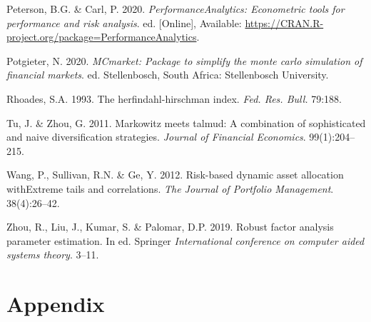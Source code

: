 \documentclass[11pt,preprint, authoryear]{elsarticle}
\numberwithin{equation}{section}
\numberwithin{figure}{section}
\numberwithin{table}{section}
\begin{document}
\leavevmode\hypertarget{ref-PerformanceAnalytics}{}%
Peterson, B.G. \& Carl, P. 2020. \emph{PerformanceAnalytics: Econometric
tools for performance and risk analysis}. ed. {[}Online{]}, Available:
\url{https://CRAN.R-project.org/package=PerformanceAnalytics}.

\leavevmode\hypertarget{ref-MCmarket}{}%
Potgieter, N. 2020. \emph{MCmarket: Package to simplify the monte carlo
simulation of financial markets}. ed. Stellenbosch, South Africa:
Stellenbosch University.

\leavevmode\hypertarget{ref-rhoades1993}{}%
Rhoades, S.A. 1993. The herfindahl-hirschman index. \emph{Fed. Res.
Bull.} 79:188.

\leavevmode\hypertarget{ref-tu2011}{}%
Tu, J. \& Zhou, G. 2011. Markowitz meets talmud: A combination of
sophisticated and naive diversification strategies. \emph{Journal of
Financial Economics}. 99(1):204--215.

\leavevmode\hypertarget{ref-wang2012}{}%
Wang, P., Sullivan, R.N. \& Ge, Y. 2012. Risk-based dynamic asset
allocation withExtreme tails and correlations. \emph{The Journal of
Portfolio Management}. 38(4):26--42.

\leavevmode\hypertarget{ref-zhou2019}{}%
Zhou, R., Liu, J., Kumar, S. \& Palomar, D.P. 2019. Robust factor
analysis parameter estimation. In ed. Springer \emph{International
conference on computer aided systems theory}. 3--11.

\newpage

\hypertarget{appendix}{%
\section*{Appendix}\label{appendix}}
\end{document}
